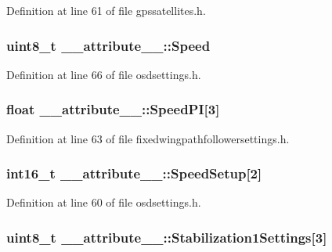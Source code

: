 \-Definition at line 61 of file gpssatellites.\-h.

\hypertarget{struct____attribute_____a8990682737da0d16ebf3dc4fad54a38f}{
\subsubsection[{\-Speed}]{\setlength{\rightskip}{0pt plus 5cm}uint8\-\_\-t {\bf \-\_\-\-\_\-attribute\-\_\-\-\_\-\-::\-Speed}}}\label{struct____attribute_____a8990682737da0d16ebf3dc4fad54a38f}


\-Definition at line 66 of file osdsettings.\-h.

\hypertarget{struct____attribute_____a2bb19864cbf62e170b6009b175df813b}{
\subsubsection[{\-Speed\-P\-I}]{\setlength{\rightskip}{0pt plus 5cm}float {\bf \-\_\-\-\_\-attribute\-\_\-\-\_\-\-::\-Speed\-P\-I}\mbox{[}3\mbox{]}}}\label{struct____attribute_____a2bb19864cbf62e170b6009b175df813b}


\-Definition at line 63 of file fixedwingpathfollowersettings.\-h.

\hypertarget{struct____attribute_____a2210c01a414e0a52c26e3f47291dba98}{
\subsubsection[{\-Speed\-Setup}]{\setlength{\rightskip}{0pt plus 5cm}int16\-\_\-t {\bf \-\_\-\-\_\-attribute\-\_\-\-\_\-\-::\-Speed\-Setup}\mbox{[}2\mbox{]}}}\label{struct____attribute_____a2210c01a414e0a52c26e3f47291dba98}


\-Definition at line 60 of file osdsettings.\-h.

\hypertarget{struct____attribute_____afbdf60f77b39a9ca1bf676e47f80f77a}{
\subsubsection[{\-Stabilization1\-Settings}]{\setlength{\rightskip}{0pt plus 5cm}uint8\-\_\-t {\bf \-\_\-\-\_\-attribute\-\_\-\-\_\-\-::\-Stabilization1\-Settings}\mbox{[}3\mbox{]}}}\label{struct____attribute_____afbdf60f77b39a9ca1bf676e47f80f77a}


